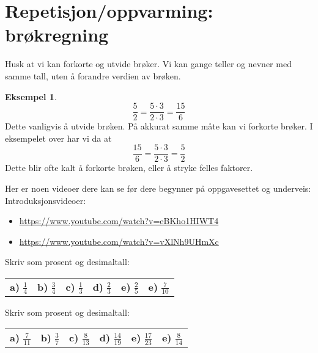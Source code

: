 \documentclass[a4, 11pt, twoside]{article}
\theoremstyle{definition}
\newtheorem{eksempel}[theorem]{Eksempel}
\begin{document}
\section*{Repetisjon/oppvarming: brøkregning}
Husk at vi kan forkorte og utvide brøker. Vi kan
gange teller og nevner med samme tall, uten å forandre verdien av brøken.
\begin{eksempel}
\[ \frac{5}{2} = \frac{5\cdot3}{2\cdot3} = \frac{15}{6}\]
Dette vanligvis å utvide brøken.
På akkurat samme måte kan vi forkorte brøker. I eksempelet over har vi da
at
\[\frac{15}{6} = \frac{5\cdot3}{2\cdot3} = \frac{5}{2}\]
Dette blir ofte kalt å forkorte brøken, eller å stryke felles faktorer.
\end{eksempel}

Her er noen videoer dere kan se før dere begynner på oppgavesettet og
underveis:
Introduksjonsvideoer:
\begin{itemize}
  \item \url{https://www.youtube.com/watch?v=eBKho1HIWT4}
  \item \url{https://www.youtube.com/watch?v=vXlNh9UHmXc}
\end{itemize}

\begin{Exercise}
Skriv som prosent og desimaltall:
    \begin{center}
    \begin{tabular}{l l l l l l}
        \textbf{a)} $\displaystyle \frac{1}{4}$ &
        \textbf{b)} $\displaystyle \frac{3}{4}$ &
        \textbf{c)} $\displaystyle \frac{1}{3}$ &
        \textbf{d)} $\displaystyle \frac{2}{3}$ &
        \textbf{e)} $\displaystyle \frac{2}{5}$ &
        \textbf{e)} $\displaystyle \frac{7}{10}$ &
    \end{tabular}
    \end{center}
\end{Exercise}

\begin{Exercise}
Skriv som prosent og desimaltall:
    \begin{center}
    \begin{tabular}{l l l l l l}
        \textbf{a)} $\displaystyle \frac{7}{11}$ &
        \textbf{b)} $\displaystyle \frac{3}{7}$ &
        \textbf{c)} $\displaystyle \frac{8}{13}$ &
        \textbf{d)} $\displaystyle \frac{14}{19}$ &
        \textbf{e)} $\displaystyle \frac{17}{23}$ &
        \textbf{e)} $\displaystyle \frac{8}{14}$ &
    \end{tabular}
    \end{center}
\end{Exercise}
\end{document}
